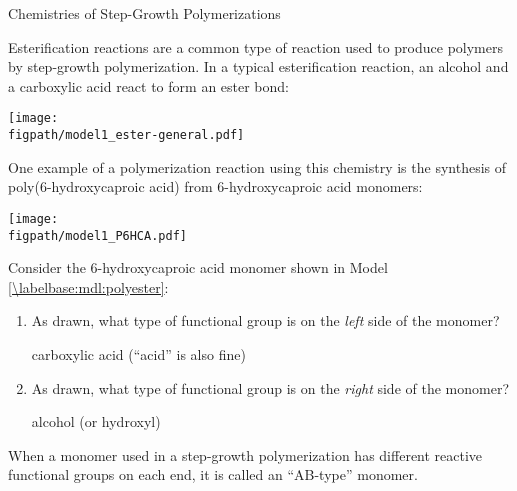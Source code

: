 \begin{activity}{Chemistries of Step-Growth Polymerizations}
\begin{instructornotes}
\end{instructornotes}


\begin{model}
\label{\labelbase:mdl:polyester}

	Esterification reactions are a common type of reaction used to produce polymers by step-growth polymerization.
	In a typical esterification reaction, an alcohol and a carboxylic acid react to form an ester bond:
	
	\centerline{\texttt{[image: \\figpath/model1\_ester-general.pdf]}}
	
	One example of a polymerization reaction using this chemistry is the synthesis of poly(6-hydroxycaproic acid) from 6-hydroxycaproic acid monomers:
	
	\centerline{\texttt{[image: \\figpath/model1\_P6HCA.pdf]}}

\end{model}


\begin{ctqs}

	\question Consider the 6-hydroxycaproic acid monomer shown in Model \ref{\labelbase:mdl:polyester}: \label{\labelbase:ctq:label-6hcpa}
	
		\begin{enumerate}
			\item As drawn, what type of functional group is on the \emph{left} side of the monomer?
			
				\begin{solution}[1in]
					carboxylic acid (``acid'' is also fine)
				\end{solution}
			
			\item As drawn, what type of functional group is on the \emph{right} side of the monomer?
			
				\begin{solution}[1in]
					alcohol (or hydroxyl)
				\end{solution}
		\end{enumerate}
		
\end{ctqs}

\begin{infobox}

	When a monomer used in a step-growth polymerization has different reactive functional groups on each end, it is called an ``AB-type'' monomer.
	

\end{infobox}
\end{activity}
